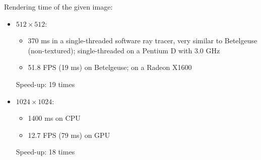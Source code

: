 \documentclass[english,fleqn,10pt,twocolumn]{article}
\begin{document}
Rendering time of the given image:
\begin{itemize}
    \item $512 \times 512$:
        \begin{itemize}
            \item 370 ms in a single-threaded software ray tracer, very similar to Betelgeuse (non-textured); single-threaded on a Pentium D with 3.0 GHz
            \item 51.8 FPS (19 ms) on Betelgeuse; on a Radeon X1600
        \end{itemize}
        Speed-up: 19 times
    \item $1024 \times 1024$:
        \begin{itemize}
            \item 1400 ms on CPU
            \item 12.7 FPS (79 ms) on GPU
        \end{itemize}
        Speed-up: 18 times
\end{itemize}


\end{document}

